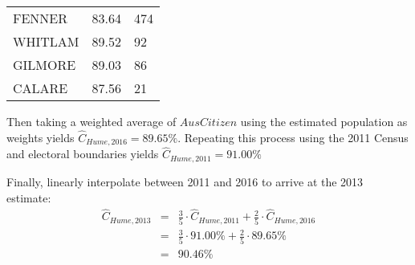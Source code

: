 \documentclass[openany]{book}
\begin{document}
\begin{longtable}[]{@{}lll@{}}
\begin{minipage}[t]{0.18\columnwidth}\raggedright
FENNER\strut
\end{minipage} & \begin{minipage}[t]{0.21\columnwidth}\raggedright
83.64\strut
\end{minipage} & \begin{minipage}[t]{0.53\columnwidth}\raggedright
474\strut
\end{minipage}\tabularnewline
\begin{minipage}[t]{0.18\columnwidth}\raggedright
WHITLAM\strut
\end{minipage} & \begin{minipage}[t]{0.21\columnwidth}\raggedright
89.52\strut
\end{minipage} & \begin{minipage}[t]{0.53\columnwidth}\raggedright
92\strut
\end{minipage}\tabularnewline
\begin{minipage}[t]{0.18\columnwidth}\raggedright
GILMORE\strut
\end{minipage} & \begin{minipage}[t]{0.21\columnwidth}\raggedright
89.03\strut
\end{minipage} & \begin{minipage}[t]{0.53\columnwidth}\raggedright
86\strut
\end{minipage}\tabularnewline
\begin{minipage}[t]{0.18\columnwidth}\raggedright
CALARE\strut
\end{minipage} & \begin{minipage}[t]{0.21\columnwidth}\raggedright
87.56\strut
\end{minipage} & \begin{minipage}[t]{0.53\columnwidth}\raggedright
21\strut
\end{minipage}\tabularnewline
\bottomrule
\end{longtable}

Then taking a weighted average of \(AusCitizen\) using the estimated population as weights yields \(\hat{C}_{Hume,2016} = 89.65 \%\). Repeating this process using the 2011 Census and electoral boundaries yields \(\hat{C}_{Hume,2011} = 91.00 \%\)

Finally, linearly interpolate between 2011 and 2016 to arrive at the 2013 estimate:
\begin{eqnarray*}
\hat{C}_{Hume,2013} & = &\frac{3}{5} \cdot \hat{C}_{Hume,2011} + \frac{2}{5} \cdot \hat{C}_{Hume,2016} \\ 
& = & \frac{3}{5} \cdot 91.00 \% + \frac{2}{5} \cdot 89.65 \% \\ 
& = & 90.46 \%
\end{eqnarray*}
\end{document}
